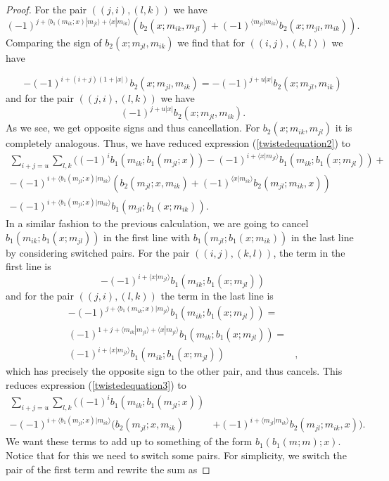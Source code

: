 \documentclass[Thesis.tex]{subfiles}
\begin{document}
\begin{proof}
For the pair $((j,i),(l,k))$ we have
\[(-1)^{j+\langle b_1(m_{ik};x)|m_{jl}\rangle+\langle x|m_{ik}\rangle}(b_2(x;m_{ik},m_{jl})+(-1)^{\langle m_{jl}|m_{ik}\rangle}b_2(x;m_{jl},m_{ik})).\]
 Comparing the sign of $b_2(x;m_{jl},m_{ik})$ we find that for $((i,j),(k,l))$ we have

\[-(-1)^{i+(i+j)(1+|x|)}b_2(x;m_{jl},m_{ik})=-(-1)^{j+u|x|}b_2(x;m_{jl},m_{ik})\]
and for the pair $((j,i),(l,k))$ we have
\[(-1)^{j+u|x|}b_2(x;m_{jl},m_{ik}).\]
As we see, we get opposite signs and thus cancellation. For $b_2(x;m_{ik},m_{jl})$ it is completely analogous. Thus, we have reduced expression (\ref{twistedequation2}) to
\begin{align}
\sum_{i+j=u}\sum_{l,k}((-1)^ib_1(m_{ik}; b_1(m_{jl};x))-(-1)^{i+\langle x|m_{jl}\rangle}b_1(m_{ik};b_1(x;m_{jl}))+\nonumber\\
 -(-1)^{i+\langle b_1(m_{jl};x)|m_{ik}\rangle}(b_2(m_{jl};x,m_{ik})+(-1)^{\langle x|m_{ik}\rangle}b_2(m_{jl};m_{ik},x))\label{twistedequation3}\\
 -(-1)^{i+\langle b_1(m_{jl};x)|m_{ik}\rangle}b_1(m_{jl};b_1(x;m_{ik})).\nonumber
\end{align}
In a similar fashion to the previous calculation, we are going to cancel $b_1(m_{ik};b_1(x;m_{jl}))$ in the first line with $b_1(m_{jl};b_1(x;m_{ik}))$ in the last line by considering switched pairs. For the pair $((i,j),(k,l))$, the term in the first line is 
\[-(-1)^{i+\langle x|m_{jl}\rangle}b_1(m_{ik};b_1(x;m_{jl}))\]
and for the pair $((j,i),(l,k))$ the term in the last line is
\begin{align*}
-(-1)^{j+\langle b_1(m_{ik};x)|m_{jl}\rangle}b_1(m_{ik};b_1(x;m_{jl}))=&\\
(-1)^{1+j+\langle m_{ik}|m_{jl}\rangle+\langle x|m_{jl}\rangle}b_1(m_{ik};b_1(x;m_{jl}))=&\\
(-1)^{i+\langle x|m_{jl}\rangle}b_1(m_{ik};b_1(x;m_{jl}))&,
\end{align*}
which has precisely the opposite sign to the other pair, and thus cancels. This reduces expression (\ref{twistedequation3}) to 
\begin{align}
\sum_{i+j=u}\sum_{l,k}((-1)^ib_1(m_{ik}; b_1(m_{jl};x))&\label{twistedequation4}\\
 -(-1)^{i+\langle b_1(m_{jl};x)|m_{ik}\rangle}(b_2(m_{jl};x,m_{ik})&+(-1)^{i+\langle m_{jl}|m_{ik}\rangle}b_2(m_{jl};m_{ik},x)).\nonumber
\end{align}
We want these terms to add up to something of the form $b_1(b_1(m;m);x)$. Notice that for this we need to switch some pairs. For simplicity, we switch the pair of the first term and rewrite the sum as

\end{proof}
\end{document}
